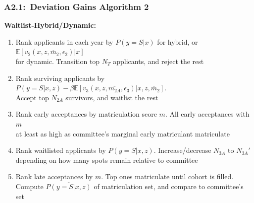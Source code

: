 \documentclass[12pt, aspectratio=169]{beamer}
\begin{document}
\begin{frame}[label=dga2]
\frametitle{A2.1:\ Deviation Gains Algorithm 2}
\textbf{Waitlist-Hybrid/Dynamic:}
\vspace{5pt}
\begin{enumerate}
\item Rank applicants in each year by $P(y=S|x)$ for hybrid, or $\mathbb{E}[v_2(x,z,\ddot{m_2},\epsilon_2)|x]$ \\ for dynamic. Transition top $N_T$ applicants, and reject the rest
\vspace{5pt}
\item Rank surviving applicants by $P(y=S|x,z)-\beta\mathbb{E}[v_3(x,z,\overline{m_{2A}},\epsilon_3)|x,z,\ddot{m_2}]$. \\ Accept top $N_{2A}$ survivors, and waitlist the rest
\vspace{5pt}
\item Rank early acceptances by matriculation score $m$. All early acceptances with $m$ \\ at least as high as committee's marginal early matriculant matriculate
\vspace{5pt}
\item Rank waitlisted applicants by $P(y=S|x,z)$. Increase/decrease $N_{3A}$ to $N_{3A}'$ depending on how many spots remain relative to committee
\vspace{5pt}
\item Rank late acceptances by $m$. Top ones matriculate until cohort is filled. \\ Compute $\overline{P(y=S|x,z)}$ of matriculation set, and compare to committee's set
\vspace{5pt}
\end{enumerate}
\hyperlink{dgi}{}
\end{frame}
\end{document}
